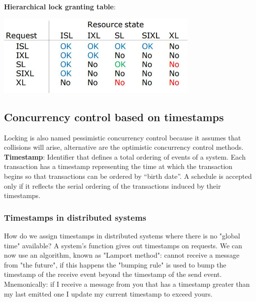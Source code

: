\textbf{Hierarchical lock granting table}:
\begin{center}
    \includegraphics[height=4cm]{../arguments/hierarchicallockgrantingtable.JPG}
\end{center}
\subsection{Concurrency control based on timestamps}
Locking is also named pessimistic concurrency control because it assumes that collisions will arise, alternative are the optimistic concurrency control methods.\newline
\newline
\textbf{Timestamp}: Identifier that defines a total ordering of events of a system.\newline
\newline
Each transaction has a timestamp representing the time
at which the transaction begins so that transactions can
be ordered by “birth date”.\newline
A schedule is accepted only if it reflects the serial
ordering of the transactions induced by their timestamps.
\subsubsection{Timestamps in distributed systems}
How do we assign timestamps in distributed systems where there is no "global time" available? A system’s function gives out timestamps on requests.\newline
We can now use an algorithm, known as "Lamport method": cannot receive a message from "the
future", if this happens the "bumping rule" is used to bump the
timestamp of the receive event beyond the timestamp of the send
event.\newline
\newline
Mnemonically: if I receive a message from you that has a
timestamp greater than my last emitted one I update my current
timestamp to exceed yours.
